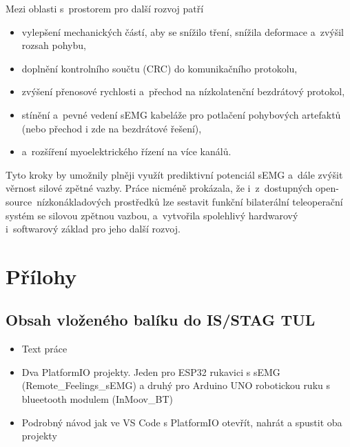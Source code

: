 \documentclass[FZS,DP]{tulthesis}
\begin{document}
Mezi oblasti s~prostorem pro další rozvoj patří
\begin{itemize}
    \item vylepšení mechanických částí, aby se snížilo tření, snížila deformace a~zvýšil rozsah pohybu,
    \item doplnění kontrolního součtu (CRC) do komunikačního protokolu,
    \item zvýšení přenosové rychlosti a~přechod na nízkolatenční bezdrátový protokol,
    \item stínění a~pevné vedení sEMG kabeláže pro potlačení pohybových artefaktů (nebo přechod i zde na bezdrátové řešení),
    \item a~rozšíření myoelektrického řízení na více kanálů.
\end{itemize}     
Tyto kroky by umožnily plněji využít prediktivní potenciál sEMG a~dále zvýšit věrnost silové zpětné vazby. Práce nicméně prokázala, že i~z~dostupných open-source~nízkonákladových prostředků lze sestavit funkční bilaterální teleoperační systém se silovou zpětnou vazbou, a~vytvořila spolehlivý hardwarový i~softwarový základ pro jeho další rozvoj.




\printbibliography[title={Použitá literatura},heading=bibintoc] %



\renewcommand{\indexname}{Přehled příkazů, prostředí a voleb}
\printindex

\appendix %
\chapter{Přílohy}
\section{Obsah vloženého balíku do IS/STAG TUL} %
\begin{itemize}
    \item Text práce 
    \item Dva PlatformIO projekty. Jeden pro ESP32 rukavici s sEMG (Remote\_Feelings\_sEMG) a druhý pro Arduino UNO robotickou ruku s blueetooth modulem (InMoov\_BT)
    \item Podrobný návod jak ve VS Code s PlatformIO otevřít, nahrát a spustit oba projekty
\end{itemize}
\end{document}
